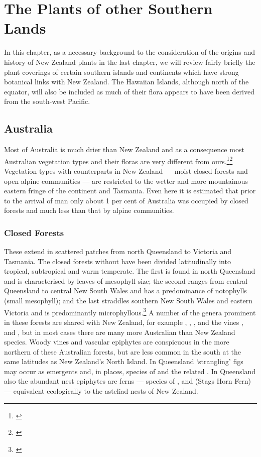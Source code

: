\chapter{The Plants of other Southern Lands}%
\label{ch:otherlands}

In this chapter, as a necessary background to the consideration of the origins and history of New Zealand plants in the last chapter, we will review fairly briefly the plant coverings of certain southern islands and continents which have strong botanical links with New Zealand.
The Hawaiian Islands, although north of the equator, will also be included as much of their flora appears to have been derived from the south-west Pacific.

\section{Australia}

Most of Australia is much drier than New Zealand and as a consequence most Australian vegetation types and their floras are very different from ours.\footnote{\cite{beadle1981vegetation}}\footnote{\cite{groves1981australian}} Vegetation types with counterparts in New Zealand --- moist closed forests and open alpine communities --- are restricted to the wetter and more mountainous eastern fringe of the continent and Tasmania.
Even here it is estimated that prior to the arrival of man only about 1 per cent of Australia was occupied by closed forests and much less than that by alpine communities.

\subsection{Closed Forests}

These extend in scattered patches from north Queensland to Victoria and Tasmania.
The closed forests without  have been divided latitudinally into tropical, subtropical and warm temperate.
The first is found in north Queensland and is characterised by leaves of mesophyll size; the second ranges from central Queensland to central New South Wales and has a predominance of notophylls (small mesophyll); and the last straddles southern New South Wales and eastern Victoria and is predominantly microphyllous.\footnote{\cite{webb1959physiognomic}}
A number of the genera prominent in these forests are shared with New Zealand, for example , , ,  and the vines ,  and , but in most cases there are many more Australian than New Zealand species.
Woody vines and vascular epiphytes are conspicuous in the more northern of these Australian forests, but are less common in the south at the same latitudes as New Zealand's North Island.
In Queensland `strangling' figs may occur as emergents and, in places, species of  and the related .
In Queensland also the abundant nest epiphytes are ferns --- species of ,  and  (Stags Horn Fern) --- equivalent ecologically to the asteliad nests of New Zealand.

